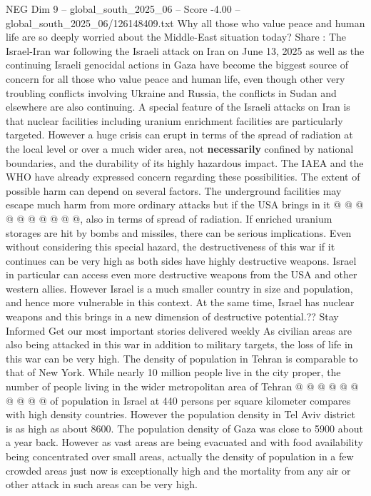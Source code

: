 \begin{textsample}{NEG Dim 9 – global\_south\_2025\_06 – Score -4.00 – global\_south\_2025\_06/126148409.txt}  \label{ex:f9_neg_276}
Why all those who value peace and human life are so deeply worried about the Middle-East situation today?
Share : The Israel-Iran war following the Israeli attack on Iran on June 13, 2025 as well as the continuing Israeli genocidal actions in Gaza have become the biggest source of concern for all those who value peace and human life, even though other very troubling conflicts involving Ukraine and Russia, the conflicts in Sudan and elsewhere are also continuing.
A special feature of the Israeli attacks on Iran is that nuclear facilities including uranium enrichment facilities are particularly targeted.
However a huge crisis can erupt in terms of the spread of radiation at the local level or over a much wider area, not \textbf{necessarily} confined by national boundaries, and the durability of its highly hazardous impact.
The IAEA and the WHO have already expressed concern regarding these possibilities.
The extent of possible harm can depend on several factors.
The underground facilities may escape much harm from more ordinary attacks but if the USA brings in it @ @ @ @ @ @ @ @ @ @, also in terms of spread of radiation.
If enriched uranium storages are hit by bombs and missiles, there can be serious implications.
Even without considering this special hazard, the destructiveness of this war if it continues can be very high as both sides have highly destructive weapons.
Israel in particular can access even more destructive weapons from the USA and other western allies.
However Israel is a much smaller country in size and population, and hence more vulnerable in this context.
At the same time, Israel has nuclear weapons and this brings in a new dimension of destructive potential.??
Stay Informed Get our most important stories delivered weekly As civilian areas are also being attacked in this war in addition to military targets, the loss of life in this war can be very high.
The density of population in Tehran is comparable to that of New York.
While nearly 10 million people live in the city proper, the number of people living in the wider metropolitan area of Tehran @ @ @ @ @ @ @ @ @ @ of population in Israel at 440 persons per square kilometer compares with high density countries.
However the population density in Tel Aviv district is as high as about 8600.
The population density of Gaza was close to 5900 about a year back.
However as vast areas are being evacuated and with food availability being concentrated over small areas, actually the density of population in a few crowded areas just now is exceptionally high and the mortality from any air or other attack in such areas can be very high.

\end{textsample}

